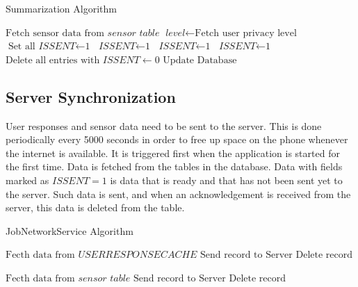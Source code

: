 \begin{algorithm}
\caption{Summarization Algorithm}\label{sum}
\begin{algorithmic}[1]
\State $\text{Fetch sensor data from } \textit{sensor table}$
\State $\textit{level} \gets \text{Fetch user privacy level}$
  \State $\text{Set all } \textit{ISSENT} \gets \text{1}$
 	 \State $\textit{ISSENT} \gets \text{1}$
 	\EndFor 
{}
 	 \State $\textit{ISSENT} \gets \text{1}$
 	\EndFor
{}
 	 \State $\textit{ISSENT} \gets \text{1}$
 	\EndFor
\EndIf
\State $\text{Delete all entries with } \textit{ISSENT} \gets 0$
\State $\text{Update Database}$
\EndFor
\EndProcedure
\end{algorithmic}
\end{algorithm}

\subsection{Server Synchronization} \label{job}

User responses and sensor data need to be sent to the server. This is done periodically every 5000 seconds in order to free up space on the phone whenever the internet is available. It is triggered first when the application is started for the first time. Data is fetched from the tables in the database. Data with fields marked as $\textit{ISSENT}=1$ is data that is ready and that has not been sent yet to the server. Such data is sent, and when an acknowledgement is received from the server, this data is deleted from the table.

\begin{algorithm}
\caption{JobNetworkService Algorithm}\label{nextday}
\begin{algorithmic}[1]
\State $ \text{Fecth data from } \textit{USERRESPONSECACHE}$
  \State $\text{Send record to Server}$
  \State $\text{Delete record}$  
  \EndIf
  \EndIf
 	\EndFor

 	 \State $ \text{Fecth data from } \textit{sensor table}$
  \State $\text{Send record to Server}$
  \State $\text{Delete record}$  
  \EndIf
  \EndIf
 	\EndFor
	
 	\EndFor
\EndProcedure
\end{algorithmic}
\end{algorithm}




